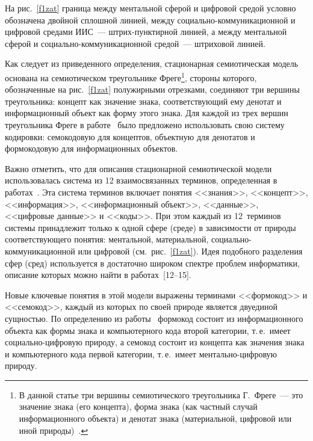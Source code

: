\begin{multicols}{2}
   На рис.~\ref{f1zat} граница между ментальной сферой и цифровой средой условно 
обозначена двойной сплошной линией, между социально-ком\-му\-ни\-ка\-ци\-он\-ной и цифровой 
средами ИИС~--- штрих-пунктирной линией, а между ментальной сферой и 
   социально-ком\-му\-ни\-ка\-ци\-он\-ной средой~--- штриховой линией.
   
   Как следует из приведенного определения, стаци\-онарная семио\-тическая модель основана 
на семиотическом треугольнике Фреге\footnote{В 
данной статье три вершины семиотического треугольника Г.~Фреге~--- это значение знака (его концепта), 
форма знака (как частный случай информационного объекта) и денотат знака (материальной, цифровой или 
иной природы)~\cite{8zat, 9zat}.\label{prim}}, стороны которого, обозначенные на рис.~\ref{f1zat} полужирными\linebreak 
отрезками, соединяют три вершины треугольника: концепт как значение знака, 
соответствующий ему денотат и информационный объект как форму этого знака. Для 
каждой из трех вершин треугольника Фреге в работе~\cite{2zat} было предложено 
использовать свою систему кодировки: семокодовую для концептов, объектную для 
денотатов и формокодовую для информационных объектов.
   
   Важно отметить, что для описания стационарной семиотической модели использовалась 
система из 12 взаимосвязанных терминов, определенная в работах~\cite{2zat, 7zat, 10zat, 
11zat}. Эта система терминов включает понятия <<знания>>, <<концепт>>, 
<<информация>>, <<информационный объект>>, <<данные>>, <<цифровые данные>> и 
<<коды>>. При этом каж\-дый из 12~терминов системы принадлежит только к одной сфере 
(среде) в зависимости от природы соответствующего понятия: ментальной, материальной, 
социально-ком\-му\-ни\-ка\-ци\-он\-ной или цифровой (см.\ рис.~\ref{f1zat}). Идея подобного 
разделения сфер (сред) используется в достаточно широком спектре проблем информатики, 
описание которых можно найти в работах~[12--15].
{ %

}
   
   Новые ключевые понятия в этой модели выражены терминами <<формокод>> и 
<<семокод>>, каж\-дый из которых по своей природе является двуединой сущностью. По 
определению из работы~\cite{10zat} формокод состоит из информационного объекта как 
формы знака и компьютерного кода второй категории, т.\,е.\ имеет социально-циф\-ро\-вую 
природу, а семокод состоит из концепта как значения знака и компьютерного кода первой 
категории, т.\,е.\ имеет ментально-цифровую природу.
   

\end{multicols}
